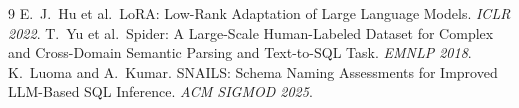 \documentclass[11pt]{article}
\begin{document}

\begin{thebibliography}{9}
E.~J.\ Hu et al.\ LoRA: Low-Rank Adaptation of Large Language Models. \textit{ICLR 2022}.
T.~Yu et al.\ Spider: A Large-Scale Human-Labeled Dataset for Complex and Cross-Domain
Semantic Parsing and Text-to-SQL Task. \textit{EMNLP 2018}.
K.~Luoma and A.~Kumar. SNAILS: Schema Naming Assessments for Improved LLM-Based SQL
Inference. \textit{ACM SIGMOD 2025}.
\end{thebibliography}
\end{document}
